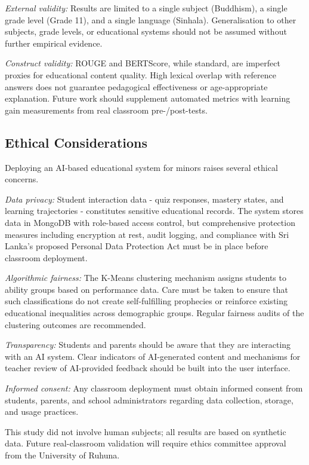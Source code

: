 \documentclass[conference]{IEEEtran}
\begin{document}
\textit{External validity:} Results are limited to a single subject (Buddhism), a single grade level (Grade 11), and a single language (Sinhala). Generalisation to other subjects, grade levels, or educational systems should not be assumed without further empirical evidence.

\textit{Construct validity:} ROUGE and BERTScore, while standard, are imperfect proxies for educational content quality. High lexical overlap with reference answers does not guarantee pedagogical effectiveness or age-appropriate explanation. Future work should supplement automated metrics with learning gain measurements from real classroom pre-/post-tests.

\subsection{Ethical Considerations}

Deploying an AI-based educational system for minors raises several ethical concerns.

\textit{Data privacy:} Student interaction data - quiz responses, mastery states, and learning trajectories - constitutes sensitive educational records. The system stores data in MongoDB with role-based access control, but comprehensive protection measures including encryption at rest, audit logging, and compliance with Sri Lanka's proposed Personal Data Protection Act must be in place before classroom deployment.

\textit{Algorithmic fairness:} The K-Means clustering mechanism assigns students to ability groups based on performance data. Care must be taken to ensure that such classifications do not create self-fulfilling prophecies or reinforce existing educational inequalities across demographic groups. Regular fairness audits of the clustering outcomes are recommended.

\textit{Transparency:} Students and parents should be aware that they are interacting with an AI system. Clear indicators of AI-generated content and mechanisms for teacher review of AI-provided feedback should be built into the user interface.

\textit{Informed consent:} Any classroom deployment must obtain informed consent from students, parents, and school administrators regarding data collection, storage, and usage practices.

This study did not involve human subjects; all results are based on synthetic data. Future real-classroom validation will require ethics committee approval from the University of Ruhuna.
\end{document}
